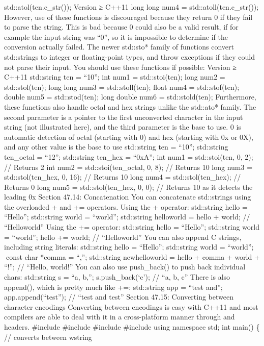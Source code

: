 std::atol(ten.c\_str()); Version ≥ C++11 long long num4 =
std::atoll(ten.c\_str()); However, use of these functions is discouraged
because they return 0 if they fail to parse the string. This is bad
because 0 could also be a valid result, if for example the input string
was ``0'', so it is impossible to determine if the conversion actually
failed. The newer std::sto* family of functions convert std::strings to
integer or ﬂoating-point types, and throw exceptions if they could not
parse their input. You should use these functions if possible: Version ≥
C++11 std::string ten = ``10''; int num1 = std::stoi(ten); long num2 =
std::stol(ten); long long num3 = std::stoll(ten); float num4 =
std::stof(ten); double num5 = std::stod(ten); long double num6 =
std::stold(ten); Furthermore, these functions also handle octal and hex
strings unlike the std::ato* family. The second parameter is a pointer
to the ﬁrst unconverted character in the input string (not illustrated
here), and the third parameter is the base to use. 0 is automatic
detection of octal (starting with 0) and hex (starting with 0x or 0X),
and any other value is the base to use std::string ten = ``10'';
std::string ten\_octal = ``12''; std::string ten\_hex = ``0xA''; int
num1 = std::stoi(ten, 0, 2); // Returns 2 int num2 =
std::stoi(ten\_octal, 0, 8); // Returns 10 long num3 =
std::stol(ten\_hex, 0, 16); // Returns 10 long num4 =
std::stol(ten\_hex); // Returns 0 long num5 = std::stol(ten\_hex, 0, 0);
// Returns 10 as it detects the leading 0x Section 47.14: Concatenation
You can concatenate std::strings using the overloaded + and +=
operators. Using the + operator: std::string hello = ``Hello'';
std::string world = ``world''; std::string helloworld = hello + world;
// ``Helloworld'' Using the += operator: std::string hello = ``Hello'';
std::string world = ``world''; hello += world; // ``Helloworld'' You can
also append C strings, including string literals: std::string hello =
``Hello''; std::string world = ``world''; const char *comma = ``,'';
std::string newhelloworld = hello + comma + world + ``!''; // ``Hello,
world!'' You can also use push\_back() to push back individual chars:
std::string s = ``a, b,''; s.push\_back(`c'); // ``a, b, c'' There is
also append(), which is pretty much like +=: std::string app = ``test
and''; app.append(``test''); // ``test and test'' Section 47.15:
Converting between character encodings Converting between encodings is
easy with C++11 and most compilers are able to deal with it in a
cross-platform manner through and headers. \#include \#include \#include
\#include using namespace std; int main() \{ // converts between wstring
